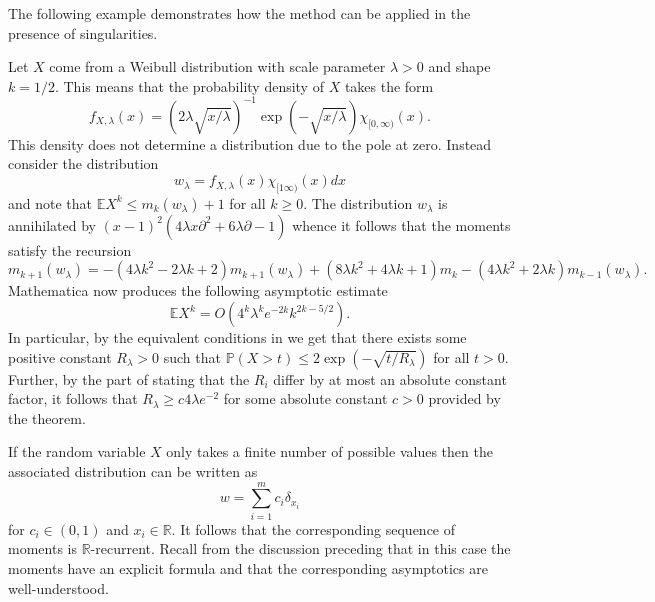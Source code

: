 The following example demonstrates how the method can be applied in the presence of singularities.
\begin{example}
  Let $X$ come from a Weibull distribution with scale parameter $\lambda>0$ and shape $k = 1/2$.
  This means that the probability density of $X$ takes the form
  $$f_{X,\lambda}(x) = (2 \lambda \sqrt{x/\lambda})^{-1}\exp(-\sqrt{x/\lambda})\chi_{[0,\infty)}(x).$$
  This density does not determine a distribution due to the pole at zero.
  Instead consider the distribution
  $$w_\lambda = f_{X,\lambda}(x)\chi_{[1\infty)}(x)dx $$
  and note that $\mathbb{E}X^k \leq m_k(w_\lambda) + 1$ for all $k\geq 0$.
  The distribution $w_\lambda$ is annihilated by $(x-1)^2(4 \lambda x \partial^2 + 6\lambda\partial - 1)$
  whence it follows that the moments satisfy the recursion
  $$m_{k+1}(w_\lambda) = -(4\lambda k^2 - 2\lambda k + 2)m_{k+1}(w_\lambda) + (8\lambda k^2 + 4\lambda k + 1)m_k - (4\lambda k^2 + 2\lambda k)m_{k-1}(w_\lambda).$$
  Mathematica now produces the following asymptotic estimate
  $$\mathbb{E}X^k = O\left(4^k\lambda^k e^{-2k}k^{2k -5/2}\right).$$
  In particular, by the equivalent conditions in  we get that there exists some positive constant $R_\lambda>0$ such that  $\mathbb{P}(X>t) \leq 2\exp(- \sqrt{t/R_\lambda}) $ for all $t>0$.
  Further, by the part of  stating that the $R_i$ differ by at most an absolute constant factor, it follows that  $R_{\lambda}\geq c4\lambda e^{-2}$ for some absolute constant $c>0$ provided by the theorem.
\end{example}
\begin{remark}
  If the random variable $X$ only takes a finite number of possible values then the associated distribution can be written as
  $$w = \sum_{i=1}^m c_i \delta_{x_i}$$
  for $c_i\in (0,1)$ and $x_i\in \mathbb{R}$.
  It follows that the corresponding sequence of moments is $\mathbb{R}$-recurrent.
  Recall from the discussion preceding  that in this case the moments have an explicit formula and that the corresponding asymptotics are well-understood.
\end{remark}
